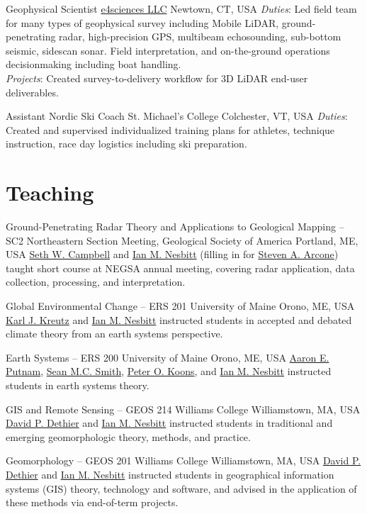 \documentclass[a4paper,12pt,sans,colorlinks]{moderncv}
\newcommand{\me}{\href{https://www.iannesbitt.org}{Ian M. Nesbitt}}
\newcommand{\seth}{\href{https://www.alpinesciences.net}{Seth W. Campbell}}
\newcommand{\sean}{\href{https://umaine.edu/earthclimate/people/sean-m-c-smith/}{Sean M.C. Smith}}
\newcommand{\stevearcone}{\href{https://engineering.dartmouth.edu/community/faculty/steven-arcone}{Steven A. Arcone}}
\newcommand{\peter}{\href{https://umaine.edu/earthclimate/people/peter-koons/}{Peter O. Koons}}
\newcommand{\aaron}{\href{https://umaine.edu/earthclimate/people/aaron-putnam/}{Aaron E. Putnam}}
\newcommand{\karl}{\href{https://umaine.edu/earthclimate/people/karl-kreutz/}{Karl J. Kreutz}}
\newcommand{\david}{\href{https://geosciences.williams.edu/profile/ddethier/}{David P. Dethier}}
\newcommand{\efour}{\href{https://e4sciences.com}{e4sciences LLC}}
\begin{document}
{Geophysical Scientist}
{\efour{}}
{Newtown, CT, USA}
{}
{
    \emph{Duties}: Led field team for many types of geophysical survey
    including Mobile LiDAR, ground-penetrating radar, high-precision GPS,
    multibeam echosounding, sub-bottom seismic, sidescan sonar. Field
    interpretation, and on-the-ground operations decisionmaking including
    boat handling.
    \\
    \emph{Projects}: Created survey-to-delivery workflow for 3D LiDAR
    end-user deliverables.
}

{Assistant Nordic Ski Coach}
{St. Michael's College}
{Colchester, VT, USA}
{}
{
    \emph{Duties}: Created and supervised individualized training plans
    for athletes, technique instruction, race day logistics including
    ski preparation.
}


\section{Teaching}


{Ground-Penetrating Radar Theory and Applications to Geological
Mapping -- SC2}
{Northeastern Section Meeting, Geological Society of America}
{Portland, ME, USA}
{}
{
    \seth{} and \me{} (filling in for \stevearcone{}) taught
    short course at NEGSA annual meeting, covering radar application,
    data collection, processing, and interpretation.
}

{Global Environmental Change -- ERS 201}
{University of Maine}
{Orono, ME, USA}
{}
{
    \karl{} and \me{} instructed students in accepted and
    debated climate theory from an earth systems perspective.
}

{Earth Systems -- ERS 200}
{University of Maine}
{Orono, ME, USA}
{}
{
    \aaron{}, \sean{}, \peter{}, and \me{} instructed students
    in earth systems theory.
}

{GIS and Remote Sensing -- GEOS 214}
{Williams College}
{Williamstown, MA, USA}
{}
{
    \david{} and \me{} instructed students in traditional and
    emerging geomorphologic theory, methods, and practice.
}

{Geomorphology -- GEOS 201}
{Williams College}
{Williamstown, MA, USA}
{}
{
    \david{} and \me{}
    instructed students in geographical information systems (GIS)
    theory, technology and software, and advised in the
    application of these methods via end-of-term projects.
}
\end{document}
